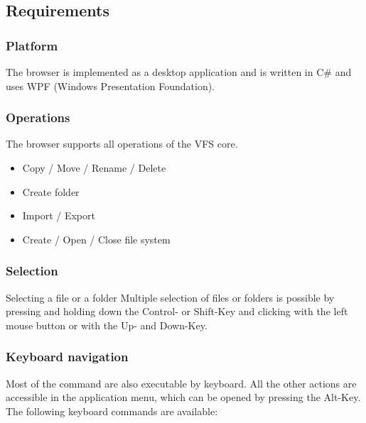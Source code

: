 \documentclass[a4paper,12pt]{article}
\begin{document}
\subsection{Requirements}
\subsubsection{Platform}
The browser is implemented as a desktop application and is written in C\# and uses WPF (Windows Presentation Foundation).

\subsubsection{Operations}
The browser supports all operations of the VFS core.
\begin{itemize}
  \item Copy / Move / Rename / Delete
  \item Create folder
  \item Import / Export
  \item Create / Open / Close file system
\end{itemize}

\subsubsection{Selection}
Selecting a file or a folder 
Multiple selection of files or folders is possible by pressing and holding down the Control- or Shift-Key and clicking with the left mouse button or with the Up- and Down-Key.

\subsubsection{Keyboard navigation}
Most of the command are also executable by keyboard. All the other actions are accessible in the application menu, which can be opened by pressing the Alt-Key.\\
The following keyboard commands are available:\\
\\
\end{document}
